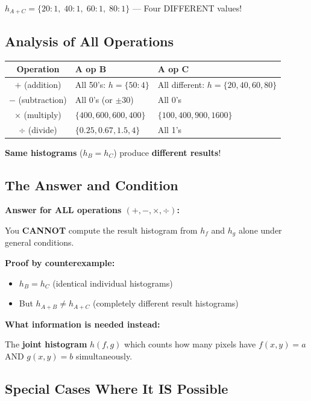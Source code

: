 \documentclass[12pt,a4paper]{article}
\begin{document}
$h_{A+C} = \{20: 1, \; 40: 1, \; 60: 1, \; 80: 1\}$ --- Four DIFFERENT values!

\subsection{Analysis of All Operations}

\begin{center}
\renewcommand{\arraystretch}{1.4}
\begin{tabular}{|c|l|l|}
\hline
\textbf{Operation} & \textbf{A op B} & \textbf{A op C} \\
\hline
$+$ (addition) & All 50's: $h = \{50:4\}$ & All different: $h = \{20,40,60,80\}$ \\
$-$ (subtraction) & All 0's (or $\pm$30) & All 0's \\
$\times$ (multiply) & $\{400, 600, 600, 400\}$ & $\{100, 400, 900, 1600\}$ \\
$\div$ (divide) & $\{0.25, 0.67, 1.5, 4\}$ & All 1's \\
\hline
\end{tabular}
\end{center}

\textbf{Same histograms} ($h_B = h_C$) produce \textbf{different results}!

\subsection{The Answer and Condition}

\begin{keypoint}
\textbf{Answer for ALL operations $(+, -, \times, \div)$:}

You \textbf{CANNOT} compute the result histogram from $h_f$ and $h_g$ alone under general conditions.

\textbf{Proof by counterexample:}
\begin{itemize}
    \item $h_B = h_C$ (identical individual histograms)
    \item But $h_{A+B} \neq h_{A+C}$ (completely different result histograms)
\end{itemize}

\textbf{What information is needed instead:}

The \textbf{joint histogram} $h(f,g)$ which counts how many pixels have $f(x,y)=a$ AND $g(x,y)=b$ simultaneously.
\end{keypoint}

\subsection{Special Cases Where It IS Possible}
\end{document}
